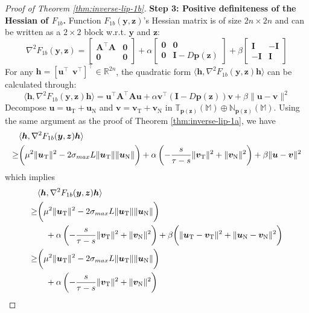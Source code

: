 \documentclass[10pt,a4paper]{amsart}
\def\mA{{\bm{A}}}
\def\mI{{\bm{I}}}
\def\sM{{\mathbb{M}}}
\def\sN{{\mathbb{N}}}
\def\sR{{\mathbb{R}}}
\def\sT{{\mathbb{T}}}
\def\vh{{\bm{h}}}
\def\vp{{\bm{p}}}
\def\vu{{\bm{u}}}
\def\vv{{\bm{v}}}
\def\vy{{\bm{y}}}
\def\vz{{\bm{z}}}
\def\vzero{{\bm{0}}}
\begin{document}
\begin{proof}[Proof of Theorem \ref{thm:inverse-lip-1b}]
\textbf{Step 3: Positive definiteness of the Hessian of $F_{1b}$.} Function $F_{1b}(\vy,\vz)$'s Hessian matrix is of size $2n \times 2n$ and can be written as a $2\times 2$ block w.r.t. $\vy$ and $\vz$:
\[ \nabla^2F_{1b}(\vy,\vz) = 
\begin{bmatrix}
\mA^\top \mA & \vzero \\ 
\vzero & \vzero
\end{bmatrix} + 
\alpha \begin{bmatrix}
\vzero & \vzero \\ 
\vzero & \mI - D\vp(\vz)
\end{bmatrix} + 
\beta \begin{bmatrix}
\mI & -\mI \\ 
-\mI & \mI
\end{bmatrix}
\]
For any $\vh = [\vu^\top~~ \vv^\top]^\top \in \sR^{2n}$, the quadratic form $\langle \vh, \nabla^2F_{1b}(\vy,\vz) \vh\rangle$ can be calculated through:
\[
\langle \vh, \nabla^2F_{1b}(\vy,\vz) \vh\rangle
= \vu^\top\mA^\top \mA\vu + \alpha \vv^\top(\mI - D\vp(\vz))\vv + \beta \|\vu-\vv\|^2
\]
Decompose $\vu = \vu_{\mathrm{T}} + \vu_{\mathrm{N}}$ and $\vv = \vv_{\mathrm{T}} + \vv_{\mathrm{N}}$ in $\sT_{\vp(\vz)}(\sM) \oplus \sN_{\vp(\vz)}(\sM)$. Using the same argument as the proof of Theorem \ref{thm:inverse-lip-1a}, we have
\begin{align*}
& \langle \vh, \nabla^2F_{1b}(\vy,\vz) \vh\rangle \\
\geq & \bigg( \mu^2 \|\vu_{\mathrm{T}} \|^2 - 2 \sigma_{\textup{max}} L\|\vu_{\mathrm{T}}\|\|\vu_{\mathrm{N}}\| \bigg) 
+ \alpha \left(- \frac{s}{\tau - s} \|\vv_{\mathrm{T}} \|^2 + \|\vv_{\mathrm{N}} \|^2  \right)
+ \beta \|\vu-\vv\|^2
\end{align*}
which implies 
\begin{align*}
& \langle \vh, \nabla^2F_{1b}(\vy,\vz) \vh\rangle  \\
\geq & \bigg( \mu^2 \|\vu_{\mathrm{T}} \|^2 - 2 \sigma_{\textup{max}} L\|\vu_{\mathrm{T}}\|\|\vu_{\mathrm{N}}\| \bigg) \\
& \quad + \alpha \left(- \frac{s}{\tau - s} \|\vv_{\mathrm{T}} \|^2 + \|\vv_{\mathrm{N}} \|^2  \right)
+ \beta \bigg( \|\vu_{\mathrm{T}}-\vv_{\mathrm{T}}\|^2 + \|\vu_{\mathrm{N}}-\vv_{\mathrm{N}}\|^2 \bigg) \\
\geq & \bigg( \mu^2 \|\vu_{\mathrm{T}} \|^2 - 2 \sigma_{\textup{max}} L\|\vu_{\mathrm{T}}\|\|\vu_{\mathrm{N}}\| \bigg) \\
& \quad + \alpha \left(- \frac{s}{\tau - s} \|\vv_{\mathrm{T}} \|^2 + \|\vv_{\mathrm{N}} \|^2  \right)

\end{align*}
\end{proof}
\end{document}
